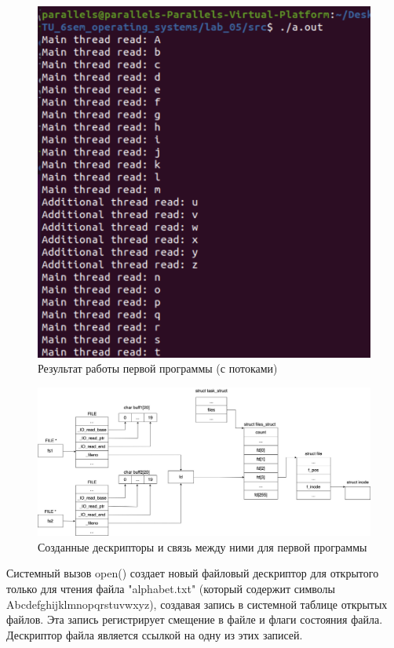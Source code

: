 \documentclass[12pt]{report}
\begin{document}
\begin{figure}[H]
	\centering
	\includegraphics[scale=0.6]{img/prog_01_thread.png}
	\caption{Результат работы первой программы (с потоками)}
	\label{fig:prog_01_thread}
\end{figure}



\begin{figure}[H]
	\centering
	\includegraphics[scale=0.3]{img/prog_01_schema.jpg}
	\caption{Созданные дескрипторы и связь между ними для первой программы}
	\label{fig:prog_01_schema}
\end{figure}

Системный вызов open() создает новый файловый дескриптор для открытого только для чтения файла "alphabet.txt" (который содержит символы Abcdefghijklmnopqrstuvwxyz), создавая запись в системной таблице открытых файлов. Эта запись регистрирует смещение в файле и флаги состояния файла. Дескриптор файла является ссылкой на одну из этих записей. 
\end{document}

